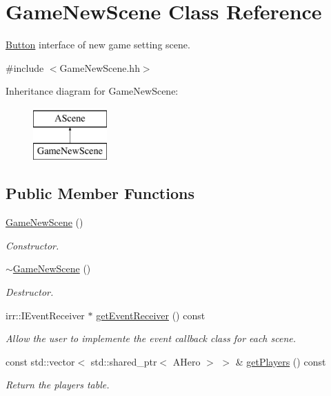 \hypertarget{classGameNewScene}{}\section{Game\+New\+Scene Class Reference}
\label{classGameNewScene}


\hyperlink{classButton}{Button} interface of new game setting scene.  




{\ttfamily \#include $<$Game\+New\+Scene.\+hh$>$}

Inheritance diagram for Game\+New\+Scene\+:\begin{figure}[H]
\begin{center}
\leavevmode
\includegraphics[height=2.000000cm]{classGameNewScene}
\end{center}
\end{figure}
\subsection*{Public Member Functions}
\begin{DoxyCompactItemize}
\item 
\hyperlink{classGameNewScene_af482b13a2d9e315ef39a6e41293bf4fb}{Game\+New\+Scene} ()
\begin{DoxyCompactList}\small\item\em Constructor. \end{DoxyCompactList}\item 
\hyperlink{classGameNewScene_a3df0ff81012d3f7dbd08c7367be22fdf}{$\sim$\+Game\+New\+Scene} ()
\begin{DoxyCompactList}\small\item\em Destructor. \end{DoxyCompactList}\item 
irr\+::\+I\+Event\+Receiver $\ast$ \hyperlink{classGameNewScene_a21c27ef3ea1923d975683e1bcdd134fa}{get\+Event\+Receiver} () const
\begin{DoxyCompactList}\small\item\em Allow the user to implemente the event callback class for each scene. \end{DoxyCompactList}\item 
\mbox{\label{classGameNewScene_a6aa753c0f281a3e1f0ed06fe10e070f4}} 
const std\+::vector$<$ std\+::shared\+\_\+ptr$<$ A\+Hero $>$ $>$ \& \hyperlink{classGameNewScene_a6aa753c0f281a3e1f0ed06fe10e070f4}{get\+Players} () const
\begin{DoxyCompactList}\small\item\em Return the players table. \end{DoxyCompactList}\end{DoxyCompactItemize}


